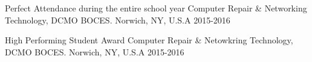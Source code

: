 




\begin{cvhonors}


\cvhonor
{Perfect Attendance during the entire school year} %
{Computer Repair \& Networking Technology, DCMO BOCES.} %
{Norwich, NY, U.S.A} %
{2015-2016} %


\cvhonor
{High Performing Student Award} %
{Computer Repair \& Netowkring Technology, DCMO BOCES.} %
{Norwich, NY, U.S.A} %
{2015-2016} %




\end{cvhonors}
